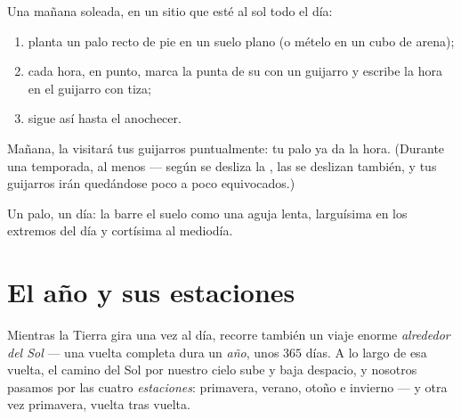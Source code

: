 \begin{method}\label{met:g3:sun-days-seasons:build}
Una mañana soleada, en un sitio que esté al sol todo el día:
\begin{enumerate}
  \item planta un palo recto de pie en un suelo plano (o mételo en un
        cubo de arena);
  \item cada hora, en punto, marca la punta de su  con un
        guijarro y escribe la hora en el guijarro con tiza;
  \item sigue así hasta el anochecer.
\end{enumerate}
Mañana, la  visitará tus guijarros puntualmente: tu palo ya da
la hora. (Durante una temporada, al menos --- según se desliza la
, las  se deslizan también, y tus guijarros irán
quedándose poco a poco equivocados.)
\end{method}

\begin{omfigure}

{\small Un palo, un día: la  barre el suelo como una aguja
lenta, larguísima en los extremos del día y cortísima al mediodía.}
\end{omfigure}

\section{El año y sus estaciones}

\begin{definition}\label{def:g3:sun-days-seasons:year}
Mientras la Tierra gira una vez al día, recorre también un viaje
enorme \emph{alrededor del Sol} --- una vuelta completa dura un
\emph{año}, unos $365$ días. A lo largo de esa vuelta, el
camino del Sol por nuestro cielo sube y baja despacio, y nosotros
pasamos por las cuatro \emph{estaciones}: primavera,
verano, otoño e invierno --- y otra vez primavera, vuelta tras vuelta.
\end{definition}

